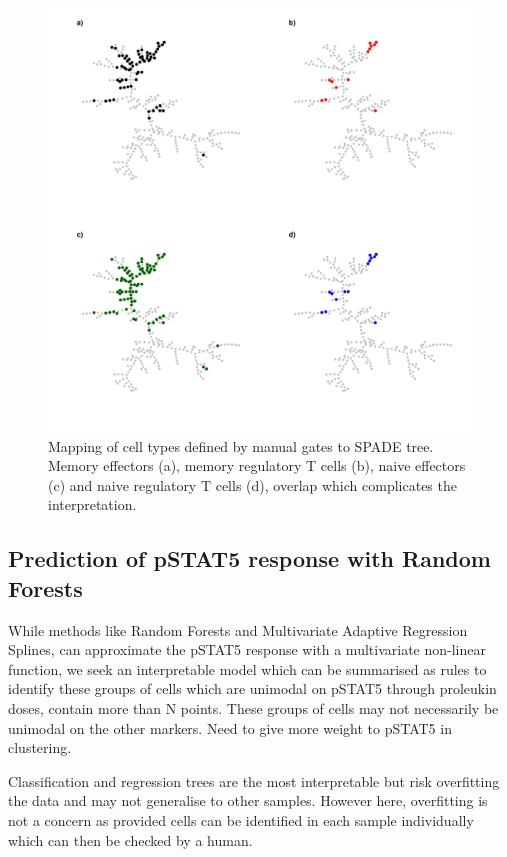 \begin{figure}[h]
    \centering
    \includegraphics[scale=.5]{IL2/figures/spade-celltypes.pdf}
    {Mapping of cell types defined by manual gates to SPADE tree.}
    {
      Memory effectors (a), memory regulatory T cells (b), naive effectors (c) and naive regulatory T cells (d), overlap which complicates
      the interpretation.
    }
\end{figure}


\subsection{Prediction of pSTAT5 response with Random Forests}

While methods like Random Forests and Multivariate Adaptive Regression Splines, can approximate the pSTAT5 response with a multivariate non-linear function,
we seek an interpretable model which can be summarised as rules to identify these groups of cells
which are unimodal on pSTAT5 through proleukin doses, contain more than N points.
These groups of cells may not necessarily be unimodal on the other markers.
Need to give more weight to pSTAT5 in clustering.

Classification and regression trees are the most interpretable but risk overfitting the data and may not generalise to other samples.
However here, overfitting is not a concern as provided cells can be identified in each sample individually which can then be checked by a human.

